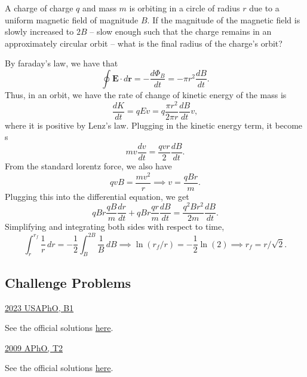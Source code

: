 \documentclass[11pt]{scrartcl}
\newcommand{\officialsol}[1]{See the official solutions \href{#1}{here}.}
\begin{document}
\begin{prob}
    A charge of charge $q$ and mass $m$ is orbiting in a circle of radius $r$ due to a uniform magnetic field of magnitude $B$. If the magnitude of the magnetic field is slowly increased to $2B$ -- slow enough such that the charge remains in an approximately circular orbit -- what is the final radius of the charge's orbit?
\end{prob}

\begin{sol}
    By faraday's law, we have that
    $$\oint \mathbf E \cdot d \mathbf r = -\frac{d \Phi_B}{d t} = -\pi r^2 \frac{dB}{dt}.$$
    Thus, in an orbit, we have the rate of change of kinetic energy of the mass is
    $$\frac{dK}{dt} = qEv = q\frac{\pi r^2}{2\pi r} \frac{dB}{dt}v,$$
    where it is positive by Lenz's law. Plugging in the kinetic energy term, it become s
    $$mv \frac{dv}{dt} = \frac{qvr}{2} \frac{dB}{dt}.$$
    From the standard lorentz force, we also have
    $$qvB = \frac{mv^2}{r} \implies v = \frac{qBr}{m}.$$
    Plugging this into the differential equation, we get
    $$qBr \frac{qB}{m}\frac{dr}{dt} + qBr\frac{qr}{m}\frac{dB}{dt} = \frac{q^2Br^2}{2m}\frac{dB}{dt}.$$
    Simplifying and integrating both sides with respect to time,
    $$\int_{r}^{r_f} \frac 1r \, dr = -\frac 12 \int_{B}^{2B} \frac 1B \, dB \implies \ln(r_f/r) = -\frac 12 \ln (2) \implies r_f =  r/\sqrt 2.$$
\end{sol}


\subsection{Challenge Problems}


\begin{prob}
    \href{https://www.aapt.org/physicsteam/upload/2023-USAPhO-Exam.pdf\#page=9}{2023 USAPhO, B1}
\end{prob}
\begin{sol}
    \officialsol{https://www.aapt.org/physicsteam/2023/upload/2023-USAPhO-solutions.pdf\#page=15}
\end{sol}

\begin{prob}
    \href{https://apho.olimpicos.net/pdf/APhO_2009_Q2.pdf}{2009 APhO, T2}
\end{prob}
\begin{sol}
    \officialsol{https://apho.olimpicos.net/pdf/APhO_2009_S2.pdf}
\end{sol}
\end{document}
